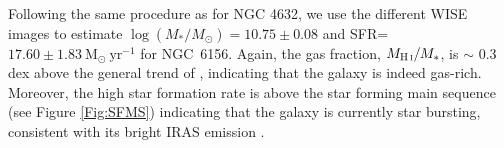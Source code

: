 \documentclass[fleqn,usenatbib]{mnras}
\newcommand{\hi}{\text{H\,\sc{i}}}
\newcommand{\Msol}{\textrm{M}_{\odot}}
\begin{document}
Following the same procedure as for NGC 4632, we use the different WISE images to estimate 
 $\log(M_{*}/M_{\odot})=10.75\pm 0.08$ and SFR=$17.60\pm1.83~\Msol~\textrm{yr}^{-1}$ for NGC~6156. Again, the gas fraction, $M_{\hi}/M_{*}$, is $\sim$ 0.3 dex above the general trend of \citet{Catinella2018}, indicating that the galaxy is indeed gas-rich.  Moreover, the high star formation rate is above the star forming main sequence (see Figure \ref{Fig:SFMS}) indicating that the galaxy is currently star bursting, consistent with its bright IRAS emission \citep{Sanders2003}. 




\end{document}

